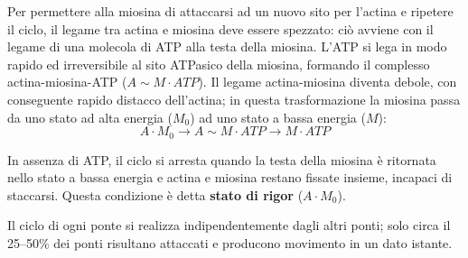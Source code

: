 Per permettere alla miosina di attaccarsi ad un nuovo sito per l'actina e ripetere il ciclo, il legame tra actina e miosina deve essere spezzato: ciò avviene con il legame di una molecola di ATP alla testa della miosina. L'ATP si lega in modo rapido ed irreversibile al sito ATPasico della miosina, formando il complesso actina-miosina-ATP ($A \sim M \cdot ATP$). Il legame actina-miosina diventa debole, con conseguente rapido distacco dell'actina; in questa trasformazione la miosina passa da uno stato ad alta energia ($M_0$) ad uno stato a bassa energia ($M$):
$$A \cdot M_0 \rightarrow A \sim M \cdot ATP \rightarrow M \cdot ATP$$

In assenza di ATP, il ciclo si arresta quando la testa della miosina è ritornata nello stato a bassa energia e actina e miosina restano fissate insieme, incapaci di staccarsi. Questa condizione è detta \textbf{stato di rigor} ($A \cdot M_0$).

Il ciclo di ogni ponte si realizza indipendentemente dagli altri ponti; solo circa il 25--50\% dei ponti risultano attaccati e producono movimento in un dato istante.
